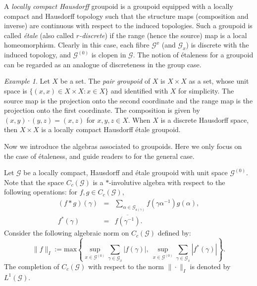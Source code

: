 \documentclass[12pt, a4paper]{amsart}
\numberwithin{equation}{section}
\theoremstyle{definition}
\theoremstyle{remark}
\newtheorem{ex}[thm]{Example}
\def\G{\mathcal{G}}
\def\Gz{\mathcal{G}^{(0)}}
\def\max{\mathrm{max}}
\def\s{\mathrm{s}}
\begin{document}
A \emph{locally compact Hausdorff} groupoid is a groupoid equipped with a locally compact and Hausdorff topology such that the structure maps (composition and inverse) are continuous with respect to the induced topologies. 
Such a groupoid is called \emph{\'{e}tale} (also called \emph{$r$-discrete}) if the range (hence the source) map is a local homeomorphism. Clearly in this case, each fibre $\G^x$ (and $\G_x$) is discrete with the induced topology, and $\Gz$ is clopen in $\G$. The notion of \'{e}taleness for a groupoid can be regarded as an analogue of discreteness in the group case. 


\begin{ex}\label{eg: pair groupoid}
Let $X$ be a set. The \emph{pair groupoid} of $X$ is $X \times X$ as a set, whose unit space is $\{(x,x) \in X \times X: x\in X\}$ and identified with $X$ for simplicity. The source map is the projection onto the second coordinate and the range map is the projection onto the first coordinate. The composition is given by $(x,y) \cdot (y,z)=(x,z)$ for $x,y,z \in X$. When $X$ is a discrete Hausdorff space, then $X \times X$ is a locally compact Hausdorff \'{e}tale groupoid. 
\end{ex}



Now we introduce the algebras associated to groupoids. Here we only focus on the case of \'{e}taleness, and guide readers to \cite{Ren80} for the general case.

Let $\G$ be a locally compact, Hausdorff and \'{e}tale groupoid with unit space $\Gz$. Note that the space $C_c(\G)$ is a $\ast$-involutive algebra with respect to the following operations: for $f,g \in C_c(\G)$,
\begin{eqnarray*}
	(f \ast g)(\gamma) &=& \sum_{\alpha \in \G_{\s(\gamma)}} f(\gamma \alpha^{-1}) g(\alpha), \\
	f^*(\gamma) &=& \overline{f(\gamma^{-1})}.
\end{eqnarray*}
Consider the following algebraic norm on $C_c(\G)$ defined by:
\[
\|f\|_I:=\max\left\{\sup_{x \in \Gz} \sum_{\gamma \in \G_x} |f(\gamma)|, ~\sup_{x \in \Gz} \sum_{\gamma \in \G_x} |f^*(\gamma)|\right\}.
\]
The completion of $C_c(\G)$ with respect to the norm $\|\cdot\|_I$ is denoted by $L^1(\G)$.
\end{document}

